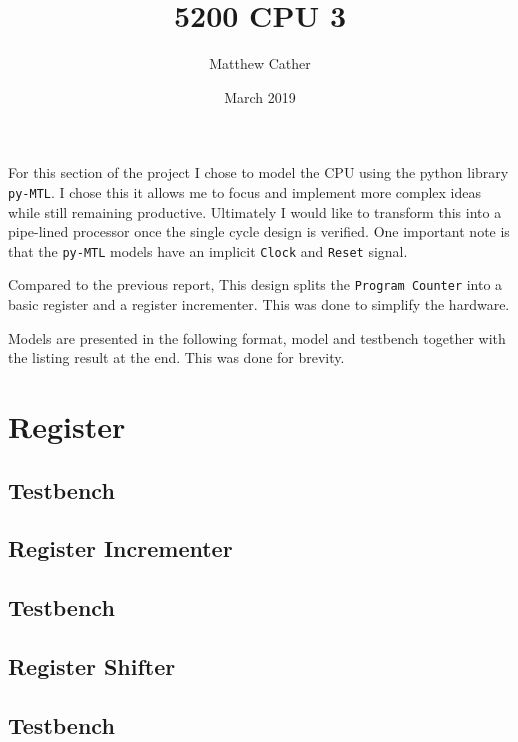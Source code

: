 \documentclass{article}
\title{5200 CPU 3}
\author{Matthew Cather}
\date{March 2019}
\begin{document}
\maketitle

For this section of the project I chose to model the CPU using the python library \texttt{py-MTL}. I chose this it allows me to focus and implement more complex ideas while still remaining productive. Ultimately I would like to transform this into a pipe-lined processor once the single cycle design is verified. One important note is that the \texttt{py-MTL} models have an implicit \texttt{Clock} and \texttt{Reset} signal.

Compared to the previous report, This design splits the \texttt{Program Counter} into a basic register and a register incrementer. This was done to simplify the hardware.

Models are presented in the following format, model and testbench together with the listing result at the end. This was done for brevity.

\tableofcontents
\clearpage

\section{Register}

\subsection{Testbench}

\subsection{Register Incrementer}

\subsection{Testbench}


\subsection{Register Shifter}

\subsection{Testbench}
\end{document}
